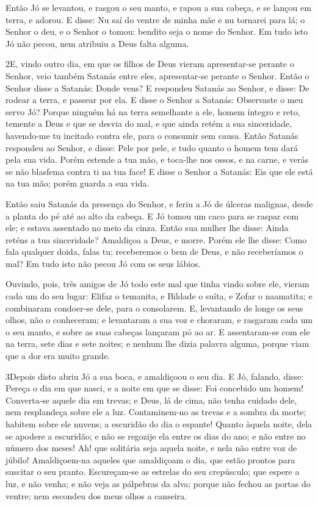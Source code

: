 Então Jó se levantou, e rasgou o seu manto, e rapou a sua cabeça,
e se lançou em terra, e adorou. E disse: Nu saí do ventre de
minha mãe e nu tornarei para lá; o Senhor o deu, e o Senhor o tomou:
bendito seja o nome do Senhor. Em tudo isto Jó não pecou, nem
atribuiu a Deus falta alguma.

\medskip

\lettrine{2} E, vindo outro dia, em que os filhos de Deus
vieram apresentar-se perante o Senhor, veio também Satanás entre
eles, apresentar-se perante o Senhor. Então o Senhor disse a
Satanás: Donde vens? E respondeu Satanás ao Senhor, e disse: De
rodear a terra, e passear por ela. E disse o Senhor a Satanás:
Observaste o meu servo Jó? Porque ninguém há na terra semelhante a
ele, homem íntegro e reto, temente a Deus e que se desvia do mal, e
que ainda retém a sua sinceridade, havendo-me tu incitado contra
ele, para o consumir sem causa. Então Satanás respondeu ao
Senhor, e disse: Pele por pele, e tudo quanto o homem tem dará pela
sua vida. Porém estende a tua mão, e toca-lhe nos ossos, e na
carne, e verás se não blasfema contra ti na tua face! E disse o
Senhor a Satanás: Eis que ele está na tua mão; porém guarda a sua
vida.

Então saiu Satanás da presença do Senhor, e feriu a Jó de úlceras
malignas, desde a planta do pé até ao alto da cabeça. E Jó tomou
um caco para se raspar com ele; e estava assentado no meio da cinza.
Então sua mulher lhe disse: Ainda reténs a tua sinceridade?
Amaldiçoa a Deus, e morre. Porém ele lhe disse: Como fala
qualquer doida, falas tu; receberemos o bem de Deus, e não
receberíamos o mal? Em tudo isto não pecou Jó com os seus lábios.

Ouvindo, pois, três amigos de Jó todo este mal que tinha vindo
sobre ele, vieram cada um do seu lugar: Elifaz o temanita, e Bildade
o suíta, e Zofar o naamatita; e combinaram condoer-se dele, para o
consolarem. E, levantando de longe os seus olhos, não o
conheceram; e levantaram a sua voz e choraram, e rasgaram cada um o
seu manto, e sobre as suas cabeças lançaram pó ao ar. E
assentaram-se com ele na terra, sete dias e sete noites; e nenhum
lhe dizia palavra alguma, porque viam que a dor era muito grande.

\medskip

\lettrine{3} Depois disto abriu Jó a sua boca, e amaldiçoou o
seu dia. E Jó, falando, disse: Pereça o dia em que nasci, e
a noite em que se disse: Foi concebido um homem! Converta-se
aquele dia em trevas; e Deus, lá de cima, não tenha cuidado dele,
nem resplandeça sobre ele a luz. Contaminem-no as trevas e a
sombra da morte; habitem sobre ele nuvens; a escuridão do dia o
espante! Quanto àquela noite, dela se apodere a escuridão; e não
se regozije ela entre os dias do ano; e não entre no número dos
meses! Ah! que solitária seja aquela noite, e nela não entre voz
de júbilo! Amaldiçoem-na aqueles que amaldiçoam o dia, que estão
prontos para suscitar o seu pranto. Escureçam-se as estrelas do
seu crepúsculo; que espere a luz, e não venha; e não veja as
pálpebras da alva; porque não fechou as portas do ventre; nem
escondeu dos meus olhos a canseira.


